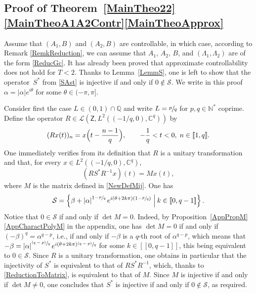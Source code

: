 \documentclass[10pt]{article}
\newcommand{\ie}{i.e.,\xspace}
\newcommand{\psfrac}[2]{\sfrac{(#1)}{#2}}
\newcommand{\llbracket}{[\![}
\newcommand{\rrbracket}{]\!]}
\theoremstyle{plain}
\theoremstyle{definition}
\newcommand{\midsuchthat}{\;\middle|\:}
\newcommand{\abs}[1]{\left\lvert #1\right \rvert}
\numberwithin{equation}{section}\numberwithin{figure}{section}\emergencystretch=3em
\begin{document}
\subsection{Proof of Theorem~\ref{MainTheo22}\eqref{MainTheoA1A2Contr}\eqref{MainTheoApprox}}

Assume that $(A_1, B)$ and $(A_2, B)$ are controllable, in which case, according to Remark \ref{RemkReduction}, we can assume that $A_1$, $A_2$, $B$, and $(\Lambda_1, \Lambda_2)$ are of the form \eqref{ReducGc}. It has already been proved that approximate controllability does not hold for $T < 2$. Thanks to Lemma~\ref{LemmS}, one is left to show that the operator~$S^\ast$ from \eqref{SAst} is injective if and only if $0 \notin \mathcal S$. We write in this proof $\alpha = \abs{\alpha} e^{i\theta}$ for some $\theta \in (-\pi, \pi]$.

Consider first the case $L \in (0, 1) \cap \mathbb Q$ and write $L = \sfrac{p}{q}$ for $p, q \in \mathbb N^\ast$ coprime. Define the operator $R \in \mathcal L\left(\mathsf Z, L^2\left(\left(-{1}/{q}, 0\right), \mathbb C^q\right)\right)$ by
\[
(R x(t))_n = x\Bigl(t - \frac{n-1}{q}\Bigr), \qquad -\frac{1}{q} < t < 0, \; n \in \llbracket 1, q\rrbracket.
\]
One immediately verifies from its definition that $R$ is a unitary transformation and that, for every $x \in L^2\left(\left(-{1}/{q}, 0\right), \mathbb C^q\right)$,
\begin{equation}
\label{ReductionToMatrix}
(R S^\ast R^{-1} x)(t) = M x(t),
\end{equation}
where $M$ is the matrix defined in \eqref{NewDefMij}. One has
\begin{equation}
\label{CRational}
\mathcal S = \left\{\beta + \abs{\alpha}^{1 - \sfrac{p}{q}} e^{i (\theta + 2 k \pi)\left(1 - \sfrac{p}{q}\right)} \midsuchthat k \in \llbracket 0, q - 1\rrbracket\right\}.
\end{equation}
Notice that $0 \in \mathcal S$ if and only if $\det M = 0$. Indeed, by Proposition~\ref{AppPropM}\eqref{AppCharactPolyM} in the appendix, one has $\det M = 0$ if and only if $(-\beta)^q = \alpha^{q - p}$, \ie if and only if $-\beta$ is a $q$-th root of $\alpha^{q - p}$, which means that $-\beta = \abs{\alpha}^{\psfrac{q - p}{q}} e^{i(\theta + 2 k \pi)\psfrac{q - p}{q}}$ for some $k \in \llbracket 0, q-1\rrbracket$, this being equivalent to $0 \in \mathcal S$. Since $R$ is a unitary transformation, one obtains in particular that the injectivity of $S^\ast$ is equivalent to that of $R S^\ast R^{-1}$, which, thanks to \eqref{ReductionToMatrix}, is equivalent to that of $M$. Since $M$ is injective if and only if $\det M \neq 0$, one concludes that $S^\ast$ is injective if and only if $0 \notin \mathcal S$, as required.
\end{document}
